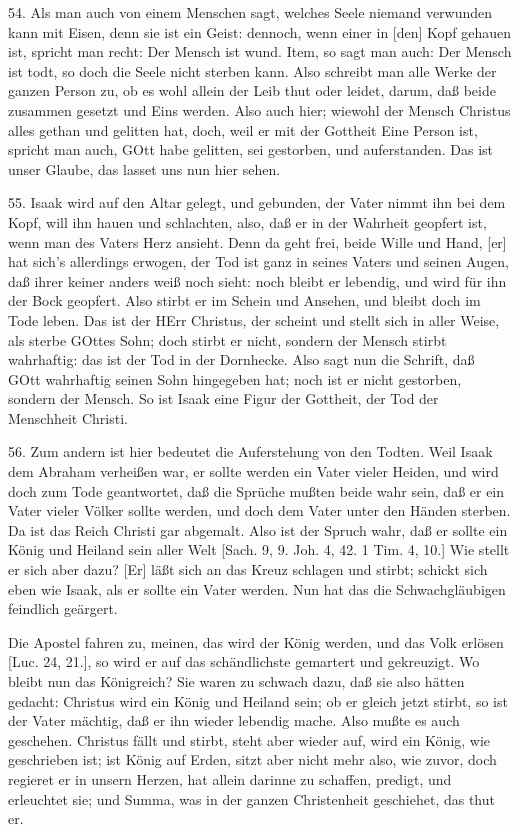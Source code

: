 54. Als man auch von einem Menschen sagt, welches Seele niemand verwunden kann mit Eisen, denn sie ist ein Geist: dennoch, wenn einer in [den] Kopf gehauen ist, spricht man recht: Der Mensch ist wund. Item, so sagt man auch: Der Mensch ist todt, so doch die Seele nicht sterben kann. Also schreibt man alle Werke der ganzen Person zu, ob es wohl allein der Leib thut oder leidet, darum, daß beide zusammen gesetzt und Eins werden. Also auch hier; wiewohl der Mensch Christus alles gethan und gelitten hat, doch, weil er mit der Gottheit Eine Person ist, spricht man auch, GOtt habe gelitten, sei gestorben, und auferstanden. Das ist unser Glaube, das lasset uns nun hier sehen.

55. Isaak wird auf den Altar gelegt, und gebunden, der Vater nimmt ihn bei dem Kopf, will ihn hauen und schlachten, also, daß er in der Wahrheit geopfert ist, wenn man des Vaters Herz ansieht. Denn da geht frei, beide Wille und Hand, [er] hat sich's allerdings erwogen, der Tod ist ganz in seines Vaters und seinen Augen, daß ihrer keiner anders weiß noch sieht: noch bleibt er lebendig, und wird für ihn der Bock geopfert. Also stirbt er im Schein und Ansehen, und bleibt doch im Tode leben. Das ist der HErr Christus, der scheint und stellt sich in aller Weise, als sterbe GOttes Sohn; doch stirbt er nicht, sondern der Mensch stirbt wahrhaftig: das ist der Tod in der Dornhecke. Also sagt nun die Schrift, daß GOtt wahrhaftig seinen Sohn hingegeben hat; noch ist er nicht gestorben, sondern der Mensch. So ist Isaak eine Figur der Gottheit, der Tod der Menschheit Christi.

56. Zum andern ist hier bedeutet die Auferstehung von den Todten. Weil Isaak dem Abraham verheißen war, er sollte werden ein Vater vieler Heiden, und wird doch zum Tode geantwortet, daß die Sprüche mußten beide wahr sein, daß er ein Vater vieler Völker sollte werden, und doch dem Vater unter den Händen sterben. Da ist das Reich Christi gar abgemalt. Also ist der Spruch wahr, daß er sollte ein König und Heiland sein aller Welt [Sach. 9, 9. Joh. 4, 42. 1 Tim. 4, 10.] Wie stellt er sich aber dazu? [Er] läßt sich an das Kreuz schlagen und stirbt; schickt sich eben wie Isaak, als er sollte ein Vater werden. Nun hat das die Schwachgläubigen feindlich geärgert.

Die Apostel fahren zu, meinen, das wird der König werden, und das Volk erlösen [Luc. 24, 21.], so wird er auf das schändlichste gemartert und gekreuzigt. Wo bleibt nun das Königreich? Sie waren zu schwach dazu, daß sie also hätten gedacht: Christus wird ein König und Heiland sein; ob er gleich jetzt stirbt, so ist der Vater mächtig, daß er ihn wieder lebendig mache. Also mußte es auch geschehen. Christus fällt und stirbt, steht aber wieder auf, wird ein König, wie geschrieben ist; ist König auf Erden, sitzt aber nicht mehr also, wie zuvor, doch regieret er in unsern Herzen, hat allein darinne zu schaffen, predigt, und erleuchtet sie; und Summa, was in der ganzen Christenheit geschiehet, das thut er.

